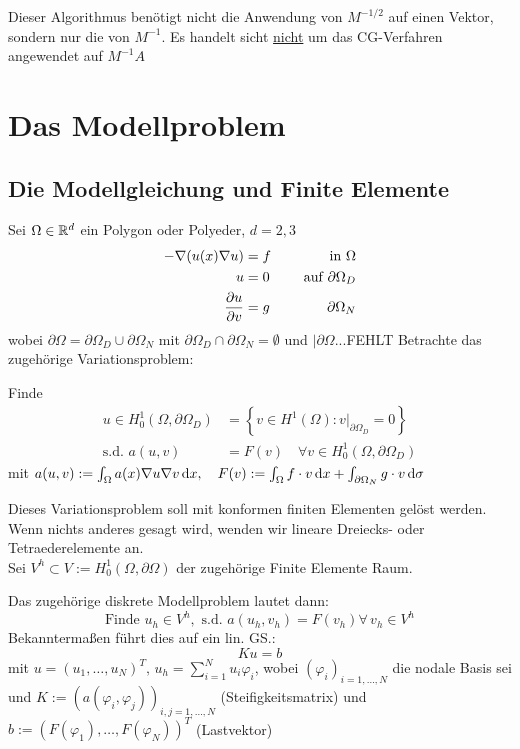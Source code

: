 \begin{bemerkung}
  Dieser Algorithmus benötigt nicht die Anwendung von $M^{-1/2}$ auf einen Vektor, sondern nur die von $M^{-1}$. Es handelt sicht \underline{nicht} um das CG-Verfahren angewendet auf $M^{-1}A$
\end{bemerkung}

\chapter{Das Modellproblem}
\section{Die Modellgleichung und Finite Elemente}
Sei $\Omega\in\mathbb{R}^d$ ein Polygon oder Polyeder, $d=2,3$
\begin{equation}
  \begin{aligned}
    -\nabla (u(x) \nabla u) &= f &\quad \textnormal{ in } \Omega\\
    u &= 0 &\quad \textnormal{ auf } \partial\Omega_D\\
    \frac{\partial u}{\partial v} &= g &\quad \partial\Omega_N
  \label{}
  \end{aligned}
\end{equation}
wobei $\partial\Omega = \partial\Omega_D \cup \partial\Omega_N$ mit $\partial\Omega_D\cap\partial\Omega_N=\emptyset$ und $|\partial\Omega .. .$FEHLT
Betrachte das zugehörige Variationsproblem:
\begin{problem}
  Finde
  \begin{align*}
    u\in H_0^1(\Omega,\partial\Omega_D) &= \left\{ v\in H^1(\Omega): v|_{\partial\Omega_D} =0 \right\}\\
    \text{s.d. } a(u,v) &= F(v) \quad \forall v\in H_0^1(\Omega,\partial\Omega_D)
  \end{align*}
  mit $a(u,v) := \int_{\Omega} a(x) \nabla u \nabla v \,\textnormal{d} x, 
     \quad F(v):=\int_\Omega f\cdot v \,\textnormal{d} x + \int_{\partial\Omega_N}g\cdot v \,\textnormal{d} \sigma$ 
\end{problem}

Dieses Variationsproblem soll mit konformen finiten Elementen gelöst werden. Wenn nichts anderes gesagt wird, wenden wir lineare Dreiecks- oder Tetraederelemente an. \\
Sei $V^h\subset V := H_0^1(\Omega,\partial\Omega)$ der zugehörige Finite Elemente Raum. 

Das zugehörige diskrete Modellproblem lautet dann:
\begin{equation}
  \text{Finde } u_h \in V^h, \text{ s.d. } a(u_h,v_h)=F(v_h) \forall \, v_h \in V^h 
\end{equation}
Bekanntermaßen führt dies auf ein lin. GS.:
\[ Ku=b \]
mit $u=(u_1,\dots , u_N)^T , \, u_h = \sum_{i=1}^N u_i \varphi_i $, wobei $(\varphi_i)_{i=1,\dots , N}$ die nodale Basis sei und $K:= (a(\varphi_i,\varphi_j))_{i,j=1,\dots ,N}$ (Steifigkeitsmatrix) und $b:= (F(\varphi_1),\dots, F(\varphi_N))^T$ (Lastvektor)\\

